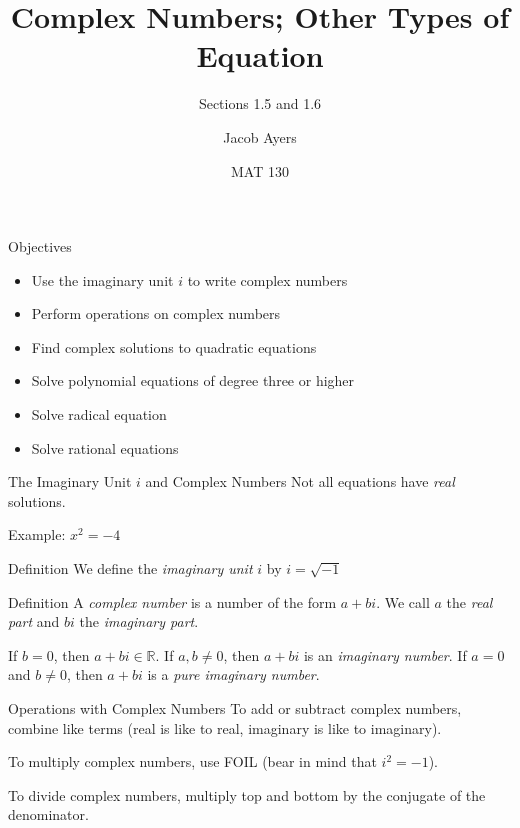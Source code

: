 \documentclass{beamer}
\title[1.5 and 1.6]{Complex Numbers; Other Types of Equation}
\subtitle{Sections 1.5 and 1.6}
\author{Jacob Ayers}
\institute{Lesson \#6}
\date{MAT 130}
\def\R{\mathbb{R}} %
\begin{document}
\begin{frame}
\titlepage
\end{frame}

\begin{frame}[t]{Objectives}
\begin{itemize}
	\item Use the imaginary unit $i$ to write complex numbers
	\item Perform operations on complex numbers
	\item Find complex solutions to quadratic equations
	\item Solve polynomial equations of degree three or higher
	\item Solve radical equation
	\item Solve rational equations
\end{itemize}
\end{frame}

\begin{frame}[t]{The Imaginary Unit $i$ and Complex Numbers}
Not all equations have \textit{real} solutions.

Example: $x^2 = -4$

\pause

\begin{block}{Definition}
We define the \textit{imaginary unit} $i$ by $i = \sqrt{-1}$
\end{block}

\pause

\begin{block}{Definition}
A \textit{complex number} is a number of the form $a + bi$. We call $a$ the \textit{real part} and $bi$ the \textit{imaginary part}.

If $b = 0$, then $a+bi \in \R$. If $a,b\neq 0$, then $a + bi$ is an \textit{imaginary number}. If $a = 0$ and $b\neq 0$, then $a + bi$ is a \textit{pure imaginary number}.
\end{block}
\end{frame}

\begin{frame}[t]{Operations with Complex Numbers}
To add or subtract complex numbers, combine like terms (real is like to real, imaginary is like to imaginary).

\pause

To multiply complex numbers, use FOIL (bear in mind that $i^2 = -1$).

\pause
To divide complex numbers, multiply top and bottom by the conjugate of the denominator.
\end{frame}
\end{document}
